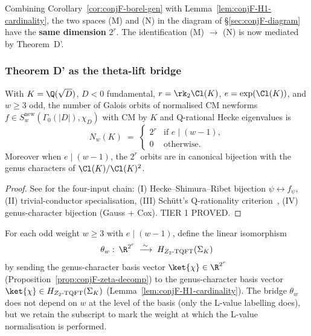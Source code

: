 Combining Corollary~\ref{cor:conjF-borel-gen} with
Lemma~\ref{lem:conjF-H1-cardinality}, the two spaces (M) and (N) in
the diagram of \S\ref{sec:conjF-diagram} have the {\bf same dimension}
$2^r$.  The identification (M) $\to$ (N) is now mediated by Theorem~D'.

\subsubsection{Theorem D' as the theta-lift bridge}
\label{sec:conjF-thmD}

\begin{theorem}
\label{thm:conjF-thmDPrime}
With $K = \Q(\sqrt D)$, $D < 0$ fundamental, $r = \rk_2 \Cl(K)$,
$e = \exp(\Cl(K))$, and $w \ge 3$ odd, the number of Galois orbits of
normalised CM newforms $f \in S_w^{\mathrm{new}}(\Gamma_0(|D|),
\chi_D)$ with CM by $K$ and Q-rational Hecke eigenvalues is
\begin{equation}\label{eq:thmDprime}
   N_w(K) \;=\;
   \begin{cases}
     2^r & \text{if } e \mid (w-1),\\
     0   & \text{otherwise.}
   \end{cases}
\end{equation}
Moreover when $e \mid (w-1)$, the $2^r$ orbits are in canonical
bijection with the genus characters of $\Cl(K)/\Cl(K)^2$.
\end{theorem}

\begin{proof}
See \cite{ThmDPrime2026} for the four-input chain: (I)
Hecke--Shimura--Ribet bijection $\psi \leftrightarrow f_\psi$, (II)
trivial-conductor specialisation, (III) Sch\"utt's
Q-rationality criterion~\cite{Schutt2008}, (IV) genus-character
bijection (Gauss + Cox).  TIER 1 PROVED.
\end{proof}

\begin{definition}\label{def:conjF-theta}
For each odd weight $w \ge 3$ with $e \mid (w-1)$, define the linear
isomorphism
\[
   \theta_w \,\colon\, \R^{2^r} \;\xrightarrow{\,\sim\,}\;
   H_{Z_2\text{-}\mathrm{TQFT}}(\Sigma_K)
\]
by sending the genus-character basis vector
$\ket{\chi} \in \R^{2^r}$ (Proposition~\ref{prop:conjF-zeta-decomp})
to the genus-character basis vector
$\ket{\chi} \in H_{Z_2\text{-}\mathrm{TQFT}}(\Sigma_K)$
(Lemma~\ref{lem:conjF-H1-cardinality}).  The bridge $\theta_w$ does
not depend on $w$ at the level of the basis (only the L-value
labelling does), but we retain the subscript to mark the weight at
which the L-value normalisation is performed.
\end{definition}

